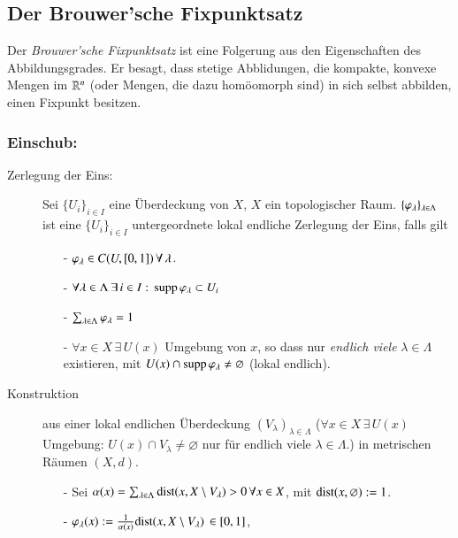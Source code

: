 \subsection{Der Brouwer'sche Fixpunktsatz}

Der \textit{Brouwer'sche Fixpunktsatz} ist eine Folgerung aus den Eigenschaften des Abbildungsgrades.
Er besagt, dass stetige Abblidungen, die kompakte, konvexe Mengen im $\mathbb{R}^n$ (oder Mengen, die dazu
homöomorph sind) in sich selbst abbilden, einen Fixpunkt besitzen.

\subsubsection*{Einschub:}

\begin{description}
        \item[Zerlegung der Eins:]
        Sei $\{U_i\}_{i\in I}$ eine Überdeckung von $X$, $X$ ein topologischer Raum.
        $\{\varphi_\lambda\}_{\lambda\in\Lambda}$ ist eine $\{U_i\}_{i\in I}$ untergeordnete lokal endliche
        Zerlegung der Eins, falls gilt
        \begin{itemize}
        \item[-] $\varphi_\lambda \in C(U,[0,1]) \,\forall\, \lambda$.
        \item[-] $\forall \lambda\in \Lambda\, \exists \, i \in I: \, \mathrm{supp}\, \varphi_\lambda\subset U_i$
        \item[-] $\sum_{\lambda \in \Lambda} \varphi _\lambda=1$
        \item[-] $\forall x \in X \, \exists \, U(x)$ Umgebung von $x$, so dass nur
        \textit{endlich viele} $\lambda \in \Lambda$ existieren, mit $U(x)\cap \mathrm{supp}\, \varphi_\lambda\neq 
        \varnothing$ (lokal endlich).
        \end{itemize}
        \item[Konstruktion] aus einer lokal endlichen Überdeckung $(V_\lambda)_{\lambda\in\Lambda}$ 
        ($\forall x\in X \, \exists \, U(x)$ Umgebung: $U(x)\cap V_\lambda\neq \varnothing$ nur für
         endlich viele $\lambda\in \Lambda$.) in metrischen Räumen $(X,d)$.
        \begin{itemize}
            \item[-] Sei $\alpha(x)=\sum_{\lambda\in \Lambda} \mathrm{dist}(x,X\setminus V_\lambda)>0 \, \forall
            x \in X$, mit $\mathrm{dist}(x,\varnothing):=1$.
            \item[-] $\varphi _\lambda(x):=\frac{1}{\alpha(x)}\mathrm{dist}(x,X\setminus V_\lambda) \, \in [0,1]$,

\end{itemize}
\end{description}
